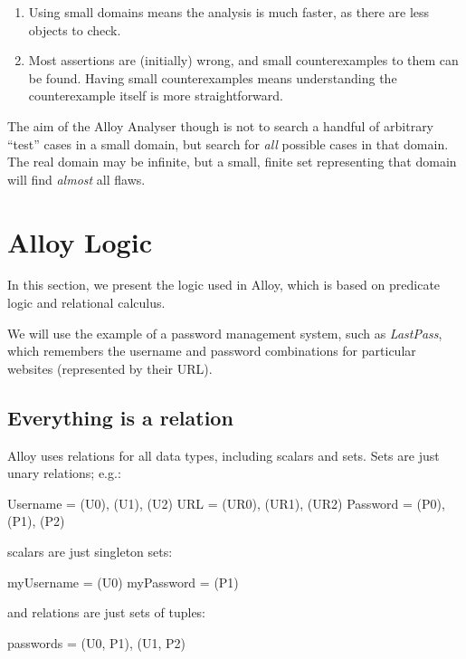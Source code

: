 \begin{enumerate}
 \item Using small domains means the analysis is much faster, as there are less objects to check.
 \item Most assertions are (initially) wrong, and small counterexamples to them can be found. Having small counterexamples means understanding the counterexample itself is more straightforward.
\end{enumerate}

The aim of the Alloy Analyser though is not to search a handful of arbitrary ``test'' cases in a small domain, but search for \emph{all} possible cases in that domain. The real domain may be infinite, but a small, finite set representing that domain will find \emph{almost} all flaws.

\section{Alloy Logic}

In this section, we present the logic used in Alloy, which is based on predicate logic and relational calculus.

We will use the example of a password management system, such as \emph{LastPass}, which remembers the username and password combinations for particular websites (represented by their URL).

\subsection{Everything is a relation}

Alloy uses relations for all data types, including scalars and sets. Sets are just unary relations; e.g.:

\begin{alloy}
 Username = {(U0), (U1), (U2)}
 URL = {(UR0), (UR1), (UR2)}
 Password = {(P0), (P1), (P2)}
\end{alloy}

scalars are just singleton sets:

\begin{alloy}
 myUsername = {(U0)}
 myPassword = {(P1)}
\end{alloy}

and relations are just sets of tuples:

\begin{alloy}
 passwords = {(U0, P1), (U1, P2)}
\end{alloy}

